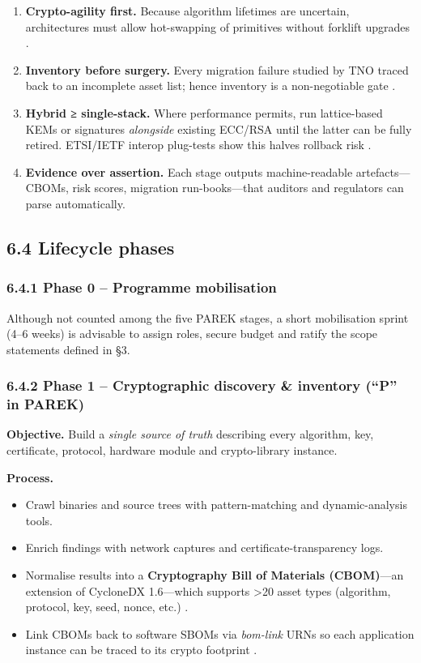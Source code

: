 \documentclass[
  english,
]{article}
\providecommand{\tightlist}{%
  \setlength{\itemsep}{0pt}\setlength{\parskip}{0pt}}
\begin{document}
\begin{enumerate}
\def\labelenumi{\arabic{enumi}.}
\tightlist
\item
  \textbf{Crypto-agility first.} Because algorithm lifetimes are
  uncertain, architectures must allow hot-swapping of primitives without
  forklift upgrades .
\item
  \textbf{Inventory before surgery.} Every migration failure studied by
  TNO traced back to an incomplete asset list; hence inventory is a
  non-negotiable gate .
\item
  \textbf{Hybrid ≥ single-stack.} Where performance permits, run
  lattice-based KEMs or signatures \emph{alongside} existing ECC/RSA
  until the latter can be fully retired. ETSI/IETF interop plug-tests
  show this halves rollback risk .
\item
  \textbf{Evidence over assertion.} Each stage outputs machine-readable
  artefacts---CBOMs, risk scores, migration run-books---that auditors
  and regulators can parse automatically.
\end{enumerate}

\subsection{6.4 Lifecycle phases}\label{lifecycle-phases}

\subsubsection{6.4.1 Phase 0 -- Programme
mobilisation}\label{phase-0-programme-mobilisation}

Although not counted among the five PAREK stages, a short mobilisation
sprint (4--6 weeks) is advisable to assign roles, secure budget and
ratify the scope statements defined in §3.

\subsubsection{6.4.2 Phase 1 -- Cryptographic discovery \& inventory
(``P'' in
PAREK)}\label{phase-1-cryptographic-discovery-inventory-p-in-parek}

\textbf{Objective.} Build a \emph{single source of truth} describing
every algorithm, key, certificate, protocol, hardware module and
crypto-library instance.

\textbf{Process.}

\begin{itemize}
\tightlist
\item
  Crawl binaries and source trees with pattern-matching and
  dynamic-analysis tools.
\item
  Enrich findings with network captures and certificate-transparency
  logs.
\item
  Normalise results into a \textbf{Cryptography Bill of Materials
  (CBOM)}---an extension of CycloneDX 1.6---which supports
  \textgreater20 asset types (algorithm, protocol, key, seed, nonce,
  etc.) .
\item
  Link CBOMs back to software SBOMs via \emph{bom-link} URNs so each
  application instance can be traced to its crypto footprint .
\end{itemize}
\end{document}
